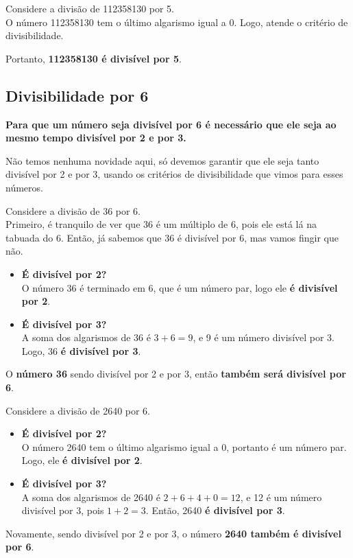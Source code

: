 \begin{exemplo}
    Considere a divisão de 112358130 por 5.\\

    O número 112358130 tem o último algarismo igual a 0. Logo, atende o critério de divisibilidade.

    Portanto, \textbf{112358130 é divisível por 5}.
\end{exemplo}

\subsection{Divisibilidade por 6}

\textbf{Para que um número seja divisível por 6 é necessário que ele seja ao mesmo tempo divisível por 2 e por 3.}

Não temos nenhuma novidade aqui, só devemos garantir que ele seja tanto divisível por 2 e por 3, usando os critérios de divisibilidade que vimos para esses números.

\begin{exemplo}
    Considere a divisão de 36 por 6.\\

    Primeiro, é tranquilo de ver que 36 é um múltiplo de 6, pois ele está lá na tabuada do 6. Então, já sabemos que 36 é divisível por 6, mas vamos fingir que não.

    \begin{itemize}
        \item \textbf{É divisível por 2?}\\
        O número 36 é terminado em 6, que é um número par, logo ele \textbf{é divisível por 2}.

        \item \textbf{É divisível por 3?}\\
        A soma dos algarismos de 36 é \(3+6=9\), e 9 é um número divisível por 3. Logo, 36 \textbf{é divisível por 3}.
    \end{itemize}

    O \textbf{número 36} sendo divisível por 2 e por 3, então \textbf{também será divisível por 6}.
\end{exemplo}

\begin{exemplo}
    Considere a divisão de 2640 por 6.\\

    \begin{itemize}
        \item \textbf{É divisível por 2?}\\
        O número 2640 tem o último algarismo igual a 0, portanto é um número par. Logo, ele \textbf{é divisível por 2}.

        \item \textbf{É divisível por 3?}\\
        A soma dos algarismos de 2640 é \(2+6+4+0=12\), e 12 é um número divisível por 3, pois \(1+2=3\). Então, 2640 \textbf{é divisível por 3}.
    \end{itemize}

    Novamente, sendo divisível por 2 e por 3, o número \textbf{2640 também é divisível por 6}.
\end{exemplo}

